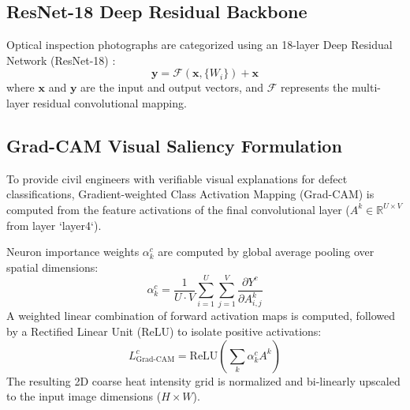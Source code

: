 \documentclass[10pt, conference, letterpaper]{IEEEtran}
\begin{document}
\subsection{ResNet-18 Deep Residual Backbone}
Optical inspection photographs are categorized using an 18-layer Deep Residual Network (ResNet-18) \cite{he2016deep}:
\begin{equation}
\mathbf{y} = \mathcal{F}(\mathbf{x}, \{W_i\}) + \mathbf{x}
\label{eq:resnet}
\end{equation}
where $\mathbf{x}$ and $\mathbf{y}$ are the input and output vectors, and $\mathcal{F}$ represents the multi-layer residual convolutional mapping.

\subsection{Grad-CAM Visual Saliency Formulation}
To provide civil engineers with verifiable visual explanations for defect classifications, Gradient-weighted Class Activation Mapping (Grad-CAM) \cite{selvaraju2017grad} is computed from the feature activations of the final convolutional layer ($A^k \in \mathbb{R}^{U \times V}$ from layer `layer4`).

Neuron importance weights $\alpha_k^c$ are computed by global average pooling over spatial dimensions:
\begin{equation}
\alpha_k^c = \frac{1}{U \cdot V} \sum_{i=1}^{U} \sum_{j=1}^{V} \frac{\partial Y^c}{\partial A_{i,j}^k}
\label{eq:gradcam_weights}
\end{equation}
A weighted linear combination of forward activation maps is computed, followed by a Rectified Linear Unit (ReLU) to isolate positive activations:
\begin{equation}
L_{\text{Grad-CAM}}^c = \text{ReLU}\left( \sum_{k} \alpha_k^c A^k \right)
\label{eq:gradcam_map}
\end{equation}
The resulting 2D coarse heat intensity grid is normalized and bi-linearly upscaled to the input image dimensions ($H \times W$).
\end{document}
